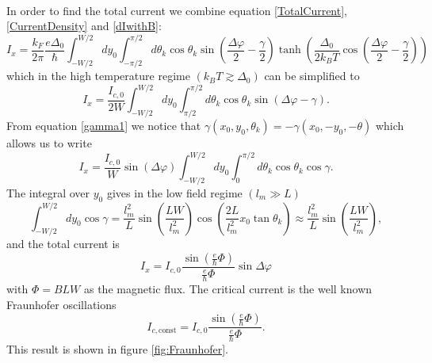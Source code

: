 \\
In order to find the total current we combine equation \eqref{TotalCurrent}, \eqref{CurrentDensity} and \eqref{dIwithB}:
\begin{equation}
I_x = \frac{k_F}{2\pi}\frac{e\Delta_0}{\hbar}\int_{-W/2}^{W/2}dy_0\int_{-\pi/2}^{\pi/2}d\theta_k\cos \theta_k \sin\left(\frac{\Delta \varphi}{2}-\frac{\gamma}{2}\right)\tanh\left(\frac{\Delta_0}{2k_BT}\cos\left(\frac{\Delta \varphi}{2}-\frac{\gamma}{2}\right)\right)
\end{equation}
which in the high temperature regime $(k_BT \gtrsim \Delta_0)$ can be simplified to
\begin{equation}
I_x = \frac{I_{c,0}}{2W}\int_{-W/2}^{W/2}dy_0\int_{\pi/2}^{\pi/2} d\theta_k \cos \theta_k \sin (\Delta \varphi - \gamma ).
\label{TotalCurrentHighT}
\end{equation}
From equation \eqref{gamma1} we notice that $\gamma(x_0,y_0,\theta_k) = -\gamma(x_0,-y_0,-\theta)$ which allows us to write
\begin{equation}
I_x = \frac{I_{c,0}}{W}\sin(\Delta \varphi) \int_{-W/2}^{W/2}dy_0\int_0^{\pi/2} d\theta_k\cos \theta_k \cos\gamma.
\end{equation}
The integral over $y_0$ gives in the low field regime $(l_m \gg L)$
\begin{equation}
\int_{-W/2}^{W/2}dy_0\cos\gamma = \frac{l_m^2}{L}\sin\left(\frac{LW}{l_m^2}\right)\cos\left(\frac{2L}{l_m^2}x_0\tan\theta_k\right) \approx \frac{l_m^2}{L}\sin\left(\frac{LW}{l_m^2}\right),
\end{equation}
and the total current is
\begin{equation}
I_x = I_{c,0}\frac{\sin\left(\frac{e}{\hbar}\Phi\right)}{\frac{e}{\hbar}\Phi}\sin \Delta \varphi
\end{equation}
with $\Phi = BLW$ as the magnetic flux. The critical current is the well known Fraunhofer oscillations
\begin{equation}
I_{c,\mathrm{const}} = I_{c,0} \frac{\sin\left(\frac{e}{\hbar}\Phi\right)}{\frac{e}{\hbar}\Phi}.
\end{equation}
This result is shown in figure \ref{fig:Fraunhofer}.
